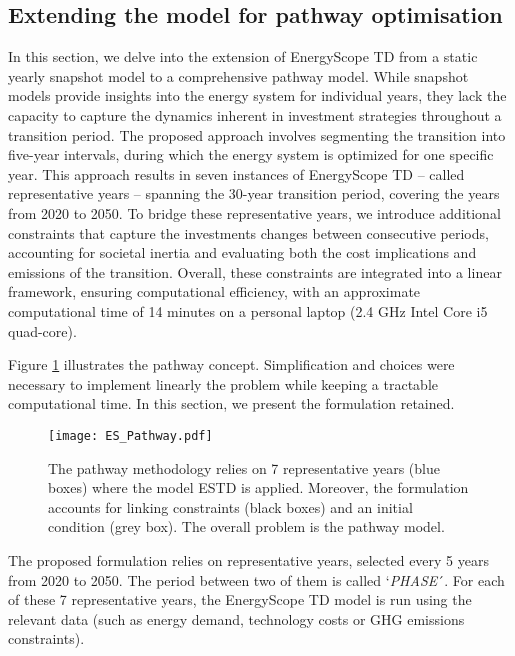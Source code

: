 \subsection{Extending the model for pathway optimisation}
\label{sec:path_methodo}

In this section, we delve into the extension of EnergyScope TD from a static yearly snapshot model to a comprehensive pathway model. While snapshot models provide insights into the energy system for individual years, they lack the capacity to capture the dynamics inherent in investment strategies throughout a transition period. The proposed approach involves segmenting the transition into five-year intervals, during which the energy system is optimized for one specific year. This approach results in seven instances of EnergyScope TD -- called representative years -- spanning the 30-year transition period, covering the years from 2020 to 2050. To bridge these representative years, we introduce additional constraints that capture the investments changes between consecutive periods, accounting for societal inertia and evaluating both the cost implications and emissions of the transition. Overall, these constraints are integrated into a linear framework, ensuring computational efficiency, with an approximate computational time of 14 minutes on a personal laptop (2.4 GHz Intel Core i5 quad-core).

Figure \ref{fig:meth_path_methodology} illustrates the pathway concept. Simplification and choices were necessary to implement linearly the problem while keeping a tractable computational time. In this section, we present the formulation retained. 

\begin{figure}[!htbp]
\centering
\texttt{[image: ES\_Pathway.pdf]}
\caption{The pathway methodology relies on 7 representative years (blue boxes) where the model \gls{ESTD} is applied. Moreover, the formulation accounts for linking constraints (black boxes) and an initial condition (grey box). The overall problem is the pathway model.}
\label{fig:meth_path_methodology}
\end{figure}

The proposed formulation relies on representative years, selected every 5 years from 2020 to 2050.  The period between two of them is called `\emph{PHASE}´.
For each of these 7 representative years, the EnergyScope TD model is run  using the relevant data (such as energy demand, technology costs or \gls{GHG} emissions constraints). 

